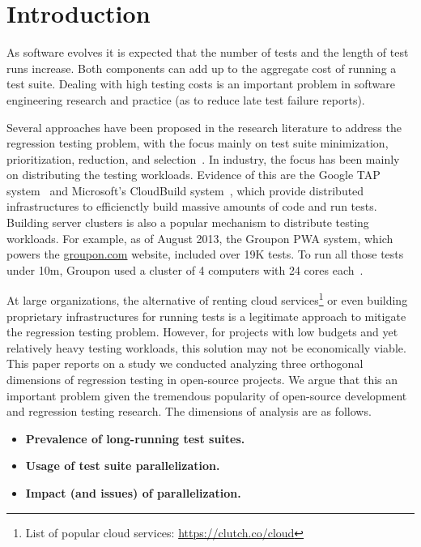 \section{Introduction}


As software evolves it is expected that the number of tests and the
length of test runs increase.  Both components can add up to the
aggregate cost of running a test suite.  Dealing with high testing
costs is an important problem in software engineering research and
practice (as to reduce late test failure reports).

Several approaches have been proposed in the research literature to
address the regression testing problem, with the focus mainly on test
suite minimization, prioritization, reduction, and
selection~\cite{yoo-harman-stvr2012}.  In industry, the focus has been
mainly on distributing the testing workloads.  Evidence of this are
the Google TAP system~\cite{google-tap,google-ci} and Microsoft's
CloudBuild system~\cite{prasad-shulte-ieee-microsoft-ci}, which
provide distributed infrastructures to efficienctly build massive
amounts of code and run tests.  Building server clusters is also a
popular mechanism to distribute testing workloads.  For example, as of
August 2013, the Groupon PWA system, which powers the
\url{groupon.com} website, included over 19K tests.  To run all those
tests under 10m, Groupon used a cluster of 4 computers with 24 cores
each~\cite{kim-etal-fse2013}.

At large organizations, the alternative of renting cloud
services\footnote{List of popular cloud services:
  \url{https://clutch.co/cloud}} or even building proprietary
infrastructures for running tests is a legitimate approach to mitigate
the regression testing problem.  However, for projects with low
budgets and yet relatively heavy testing workloads, this solution may
not be economically viable.  This paper reports on a study we
conducted analyzing three orthogonal dimensions of regression testing
in open-source projects.  We argue that this an important problem
given the tremendous popularity of open-source development and
regression testing research.  The dimensions of analysis are as
follows.

\begin{itemize}
\item \textbf{Prevalence of long-running test suites.}
\item \textbf{Usage of test suite parallelization.}  
\item \textbf{Impact (and issues) of parallelization.}  
\end{itemize}  

